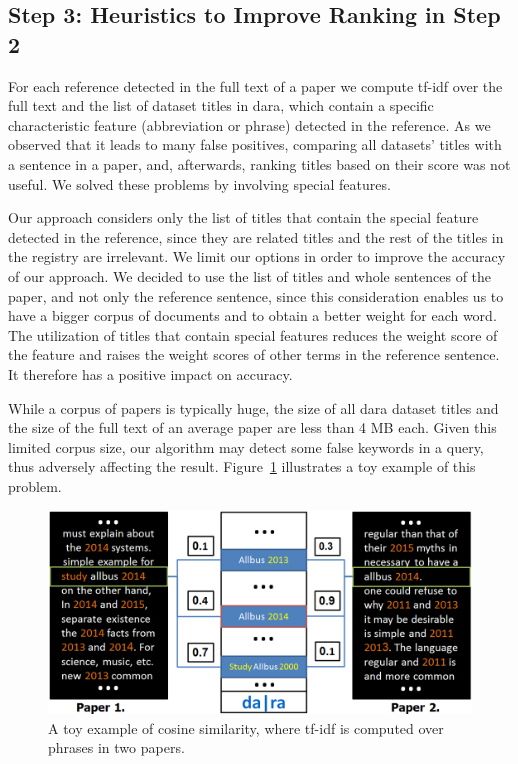 \documentclass{IOS-Book-Article}
\newcommand{\dara}{\textsf{da\textbar ra}}
\begin{document}
\subsection{Step 3: Heuristics to Improve Ranking in Step 2}
\label{sec:heur-impr-rank}

For each reference detected in the full text of a paper we compute tf-idf over the full text and the list of dataset titles in {\dara}, which contain a specific characteristic feature (abbreviation or phrase) detected in the reference.
As we observed that it leads to many false positives, comparing all datasets' titles with a sentence in a paper, and, afterwards, ranking titles based on their score was not useful.
We solved these problems by involving special features.

Our approach considers only the list of titles that contain the special feature detected in the reference, since they are related titles and the rest of the titles in the registry are irrelevant.
We limit our options in order to improve the accuracy of our approach.
We decided to use the list of titles and whole sentences of the paper, and not only the reference sentence, since this consideration enables us to have a bigger corpus of documents and to obtain a better weight for each word.
The utilization of titles that contain special features reduces the weight score of the feature and raises the weight scores of other terms in the reference sentence.
It therefore has a positive impact on accuracy.

While a corpus of papers is typically huge, the size of all {\dara} dataset titles and the size of the full text of an average paper are less than 4 MB each.
Given this limited corpus size, our algorithm may detect some false keywords in a query, thus adversely affecting the result.
Figure~\ref{fig:similarity-example} illustrates a toy example of this problem.

\begin{figure}[h]
	\centering
	\includegraphics[width=4.5 in]{ToyExamplE.PNG} 
	\caption{A toy example of cosine similarity, where tf-idf is computed over phrases in two papers.}
	\label{fig:similarity-example}
\end{figure}
\end{document}
